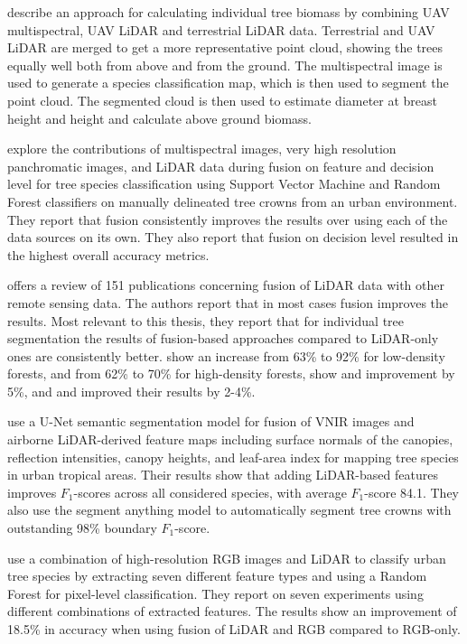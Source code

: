 \citet{lianBiomassCalculationsIndividual2022} describe an approach for calculating individual tree biomass by combining UAV multispectral, UAV LiDAR and terrestrial LiDAR data.
Terrestrial and UAV LiDAR are merged to get a more representative point cloud, showing the trees equally well both from above and from the ground.
The multispectral image is used to generate a species classification map, which is then used to segment the point cloud.
The segmented cloud is then used to estimate diameter at breast height and height and calculate above ground biomass.

\citet{liFusionApproachesIndividual2023} explore the contributions of multispectral images, very high resolution panchromatic images, and LiDAR data during fusion on feature and decision level for tree species classification using Support Vector Machine and Random Forest classifiers on manually delineated tree crowns from an urban environment.
They report that fusion consistently improves the results over using each of the data sources on its own.
They also report that fusion on decision level resulted in the highest overall accuracy metrics.

\citet{balestraLiDARDataFusion2024} offers a review of 151 publications concerning fusion of LiDAR data with other remote sensing data.
The authors report that in most cases fusion improves the results.
Most relevant to this thesis, they report that for individual tree segmentation the results of fusion-based approaches compared to LiDAR-only ones are consistently better.
\citet{laExtractionIndividualTree2015} show an increase from 63\% to 92\% for low-density forests, and from 62\% to 70\% for high-density forests, \citet{aubry-kientzMultisensorDataFusion2021} show and improvement by 5\%, and \citet{zhenImpactTreeOrientedGrowth2014} and \citet{arenas-corralizaAutomaticMappingTree2020} improved their results by 2-4\%.

\citet{ferreiraImprovingUrbanTree2024} use a U-Net semantic segmentation model for fusion of VNIR images and airborne LiDAR-derived feature maps including surface normals of the canopies, reflection intensities, canopy heights, and leaf-area index for mapping tree species in urban tropical areas.
Their results show that adding LiDAR-based features improves $F_1$-scores across all considered species, with average $F_1$-score 84.1.
They also use the segment anything model \citep{Kirillov_2023_ICCV} to automatically segment tree crowns with outstanding 98\% boundary $F_1$-score.

\citet{wuFineClassificationUrban2024} use a combination of high-resolution RGB images and LiDAR to classify urban tree species by extracting seven different feature types and using a Random Forest for pixel-level classification.
They report on seven experiments using different combinations of extracted features.
The results show an improvement of 18.5\% in accuracy when using fusion of LiDAR and RGB compared to RGB-only.


